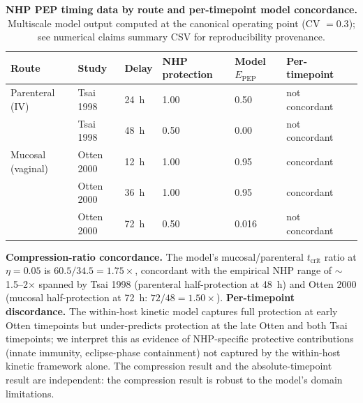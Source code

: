 \documentclass[11pt]{article}
\theoremstyle{definition}
\theoremstyle{remark}
\newcommand{\Epep}{E_{\text{PEP}}}
\newcommand{\tcrit}{t_{\text{crit}}}
\begin{document}
\begin{table}[H]
\centering
\caption{\textbf{NHP PEP timing data by route and per-timepoint model concordance.} Multiscale model output computed at the canonical operating point (CV $= 0.3$); see numerical claims summary CSV for reproducibility provenance.}
\label{tab:nhp}
\small
\begin{tabular}{@{}llllllc@{}}
\toprule
\textbf{Route} & \textbf{Study} & \textbf{Delay} & \textbf{NHP protection} & \textbf{Model $\Epep$} & \textbf{Per-timepoint} \\
\midrule
Parenteral (IV)   & Tsai 1998\cite{tsai1995}    & 24~h & 1.00 & 0.50 & not concordant \\
                  & Tsai 1998                   & 48~h & 0.50 & 0.00 & not concordant \\
Mucosal (vaginal) & Otten 2000\cite{otten2000}  & 12~h & 1.00 & 0.95 & concordant \\
                  & Otten 2000                  & 36~h & 1.00 & 0.95 & concordant \\
                  & Otten 2000                  & 72~h & 0.50 & 0.016 & not concordant \\
\bottomrule
\end{tabular}

\vspace{0.3em}
\footnotesize
\textbf{Compression-ratio concordance.} The model's mucosal/parenteral $\tcrit$ ratio at $\eta = 0.05$ is $60.5/34.5 = 1.75\times$, concordant with the empirical NHP range of $\sim$1.5--2$\times$ spanned by Tsai 1998 (parenteral half-protection at 48~h) and Otten 2000 (mucosal half-protection at 72~h: $72/48 = 1.50\times$). \textbf{Per-timepoint discordance.} The within-host kinetic model captures full protection at early Otten timepoints but under-predicts protection at the late Otten and both Tsai timepoints; we interpret this as evidence of NHP-specific protective contributions (innate immunity, eclipse-phase containment) not captured by the within-host kinetic framework alone. The compression result and the absolute-timepoint result are independent: the compression result is robust to the model's domain limitations.
\end{table}
\end{document}

